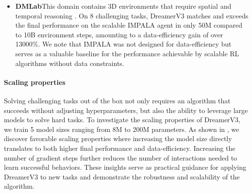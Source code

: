 \begin{itemize}
 This benchmark includes 23 environments with a total of 468 configurations that are designed to test credit assignment, robustness to reward scale and stochasticity, memory, generalization, and exploration \citep{osband2019bsuite}. DreamerV3 establishes a new state-of-the-art on this benchmark, outperforming Bootstrap DQN \citep{osband2016bootdqn} as well as Muesli \citep{hessel2021muesli} with comparable amount of training. DreamerV3 improves over previous algorithms the most in the credit assignment category.
 This procedurally generated survival environment with top-down graphics and discrete actions is designed to evaluate a broad range of agent abilities, including wide and deep exploration, long-term reasoning and credit assignment, and generalization \citep{hafner2021crafter}. DreamerV3 sets a new state-of-the-art on this benchmark, outperforming PPO with the LSTM-SPCNN architecture \citep{stanic2022crafterobject}, the object-centric OC-SA \citep{stanic2022crafterobject}, DreamerV2 \citep{hafner2020dreamerv2}, and Rainbow \citep{hessel2018rainbow}.
\item
\parbox[t]{\dimexpr\textwidth-\leftmargin}{%
\vspace{-2.5mm}

\textbf{DMLab}\quad This domain contains 3D environments that require spatial and temporal reasoning \citep{beattie2016dmlab}. On 8 challenging tasks, DreamerV3 matches and exceeds the final performance on the scalable IMPALA agent \citep{espeholt2018impala} in only 50M compared to 10B environment steps, amounting to a data-efficiency gain of over 13000\%. We note that IMPALA was not designed for data-efficiency but serves as a valuable baseline for the performance achievable by scalable RL algorithms without data constraints.}
\end{itemize}

\paragraph{Scaling properties}

Solving challenging tasks out of the box not only requires an algorithm that succeeds without adjusting hyperparameters, but also the ability to leverage large models to solve hard tasks.
To investigate the scaling properties of DreamerV3, we train 5 model sizes ranging from 8M to 200M parameters.
As shown in , we discover favorable scaling properties where increasing the model size directly translates to both higher final performance and data-efficiency.
Increasing the number of gradient steps further reduces the number of interactions needed to learn successful behaviors.
These insights serve as practical guidance for applying DreamerV3 to new tasks and demonstrate the robustness and scalability of the algorithm.

